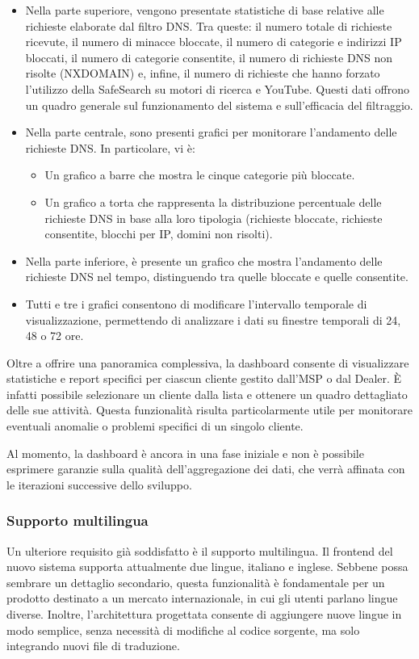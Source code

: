 \begin{itemize}
  \item Nella parte superiore, vengono presentate statistiche di base relative alle richieste elaborate dal filtro DNS. Tra queste: il numero totale di richieste ricevute, il numero di minacce bloccate, il numero di categorie e indirizzi IP bloccati, il numero di categorie consentite, il numero di richieste DNS non risolte (NXDOMAIN) e, infine, il numero di richieste che hanno forzato l’utilizzo della SafeSearch su motori di ricerca e YouTube. Questi dati offrono un quadro generale sul funzionamento del sistema e sull'efficacia del filtraggio.

  \item Nella parte centrale, sono presenti grafici per monitorare l’andamento delle richieste DNS. In particolare, vi è:
    \begin{itemize}
      \item Un grafico a barre che mostra le cinque categorie più bloccate.
      \item Un grafico a torta che rappresenta la distribuzione percentuale delle richieste DNS in base alla loro tipologia (richieste bloccate, richieste consentite, blocchi per IP, domini non risolti).
    \end{itemize}

  \item Nella parte inferiore, è presente un grafico che mostra l’andamento delle richieste DNS nel tempo, distinguendo tra quelle bloccate e quelle consentite.

  \item Tutti e tre i grafici consentono di modificare l'intervallo temporale di visualizzazione, permettendo di analizzare i dati su finestre temporali di 24, 48 o 72 ore.
\end{itemize}
%
Oltre a offrire una panoramica complessiva, la dashboard consente di visualizzare statistiche e report specifici per ciascun cliente gestito dall’MSP o dal Dealer. È infatti possibile selezionare un cliente dalla lista e ottenere un quadro dettagliato delle sue attività. Questa funzionalità risulta particolarmente utile per monitorare eventuali anomalie o problemi specifici di un singolo cliente.

Al momento, la dashboard è ancora in una fase iniziale e non è possibile esprimere garanzie sulla qualità dell'aggregazione dei dati, che verrà affinata con le iterazioni successive dello sviluppo.

\subsubsection{Supporto multilingua}
Un ulteriore requisito già soddisfatto è il supporto multilingua. Il frontend del nuovo sistema supporta attualmente due lingue, italiano e inglese. Sebbene possa sembrare un dettaglio secondario, questa funzionalità è fondamentale per un prodotto destinato a un mercato internazionale, in cui gli utenti parlano lingue diverse. Inoltre, l’architettura progettata consente di aggiungere nuove lingue in modo semplice, senza necessità di modifiche al codice sorgente, ma solo integrando nuovi file di traduzione.

